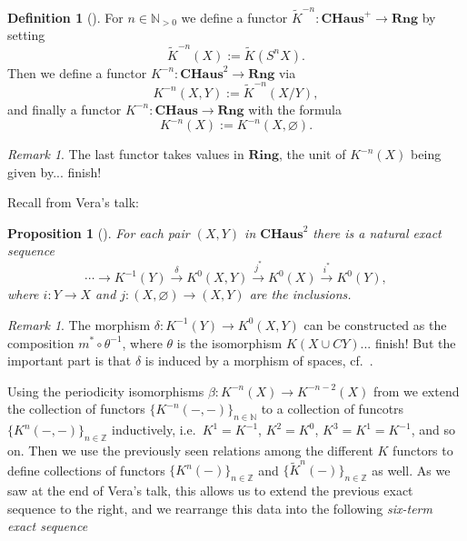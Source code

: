 \documentclass[12pt,a4paper]{amsart}
\theoremstyle{plain}
\newtheorem{prop}[thm]{Proposition}
\theoremstyle{definition}
\newtheorem{defn}[thm]{Definition}
\theoremstyle{remark}
\newtheorem{rem}[thm]{Remark}
\begin{document}
\begin{defn}[{\cite[Definition 2.4.1]{ati67}}]
  For $n \in \mathbb{N}_{>0}$ we define a functor $\tilde{K}^{-n} \colon \mathbf{CHaus}^{+} \to \mathbf{Rng}$ by setting
  \[ \tilde{K}^{-n}(X) := \tilde{K}(S^{n}X). \]
  Then we define a functor $K^{-n} \colon \mathbf{CHaus}^{2} \to \mathbf{Rng}$ via
  \[ K^{-n}(X,Y) := \tilde{K}^{-n}(X/Y), \]
  and finally a functor $K^{-n} \colon \mathbf{CHaus} \to \mathbf{Rng}$ with the formula
  \[ K^{-n}(X) := K^{-n}(X, \varnothing). \]
\end{defn}

\begin{rem}
  The last functor takes values in $\mathbf{Ring}$, the unit of $K^{-n}(X)$ being given by... \color{red} finish! \color{black}
\end{rem}

Recall from Vera's talk:

\begin{prop}[{\cite[Proposition 2.4.4]{ati67}}]
  For each pair $(X,Y)$ in $\mathbf{CHaus}^{2}$ there is a natural exact sequence
  \[ \cdots \to K^{-1}(Y) \xrightarrow{\delta} K^{0}(X,Y) \xrightarrow{j^{*}} K^{0}(X) \xrightarrow{i^{*}} K^{0}(Y), \]
  where $i \colon Y \to X$ and $j \colon (X,\varnothing) \to (X,Y)$ are the inclusions.
\end{prop}

\begin{rem}
  The morphism $\delta \colon K^{-1}(Y) \to K^{0}(X,Y)$ can be constructed as the composition $m^{*} \circ \theta^{-1}$, where $\theta$ is the isomorphism $K(X \cup CY)$... \color{red} finish! \color{black}
  But the important part is that $\delta$ is induced by a morphism of spaces, cf.~\cite[p.~77]{ati67}.
\end{rem}

Using the periodicity isomorphisms $\beta \colon K^{-n}(X) \to K^{-n-2}(X)$ from \cite[Theorem 2.4.9]{ati67} we extend the collection of functors $\{ K^{-n}(-,-) \}_{n \in \mathbb{N}}$ to a collection of funcotrs $\{ K^{n}(-,-) \}_{n \in \mathbb{Z}}$ inductively, i.e.~$K^{1} = K^{-1}$, $K^{2} = K^{0}$, $K^{3} =K^{1} = K^{-1}$, and so on.
Then we use the previously seen relations among the different $K$ functors to define collections of functors $\{ K^{n}(-) \}_{n \in \mathbb{Z}}$ and $\{ \tilde{K}^{n}(-) \}_{n \in \mathbb{Z}}$ as well.
As we saw at the end of Vera's talk, this allows us to extend the previous exact sequence to the right, and we rearrange this data into the following \textit{six-term exact sequence}
\end{document}
